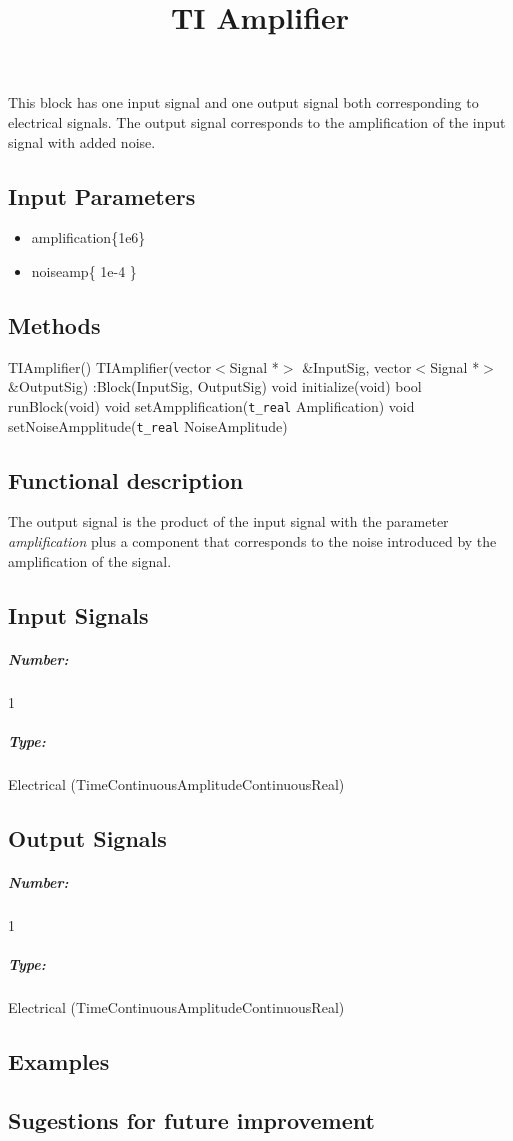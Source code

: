 \documentclass[a4paper]{article}
\title{TI Amplifier}
\begin{document}
\maketitle

This block has one input signal and one output signal both corresponding to electrical signals. The output signal corresponds to the amplification of the input signal with added noise.


\subsection*{Input Parameters}

\begin{itemize}
	\item amplification\{1e6\}
	\item noiseamp\{ 1e-4 \}
\end{itemize}

\subsection*{Methods}
 
TIAmplifier() {}
\bigbreak
TIAmplifier(vector$<$Signal *$>$ \&InputSig, vector$<$Signal *$>$ \&OutputSig) :Block(InputSig, OutputSig) {}
\bigbreak
void initialize(void)
\bigbreak
bool runBlock(void)
\bigbreak
void setAmpplification(\texttt{t\_real} Amplification)
\bigbreak
void setNoiseAmpplitude(\texttt{t\_real} NoiseAmplitude)

\subsection*{Functional description}

The output signal is the product of the input signal with the parameter \textit{amplification} plus a component that corresponds to the noise introduced by the amplification of the signal. 

\pagebreak

\subsection*{Input Signals}

\subparagraph*{Number:} 1

\subparagraph*{Type:} Electrical (TimeContinuousAmplitudeContinuousReal)

\subsection*{Output Signals}

\subparagraph*{Number:} 1

\subparagraph*{Type:} Electrical (TimeContinuousAmplitudeContinuousReal)

\subsection*{Examples} 

\subsection*{Sugestions for future improvement}
\end{document}
